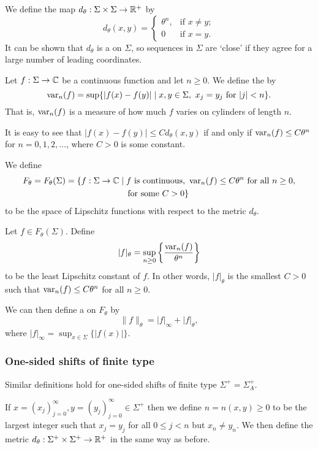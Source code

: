 We define the map $d_\theta : \Sigma \times \Sigma \to \mathbb{R}^+$ by
\[
	d_\theta(x, y) =
	\begin{cases}
		\theta^n, & \text{if } x \neq y; \\
		0 & \text{if } x = y.
	\end{cases}
\]
It can be shown that $d_\theta$ is a  on $\Sigma$, so sequences in $\Sigma$ are `close' if they agree for a large number of leading coordinates.

Let $f : \Sigma \to \mathbb{C}$ be a continuous function and let $n \geq 0$. We define the  by
\[
	\operatorname{var}_n(f) = \sup\{|f(x) - f(y)| \mid x, y \in \Sigma,\ x_j = y_j \text{ for } |j| < n\}.
\]
That is, $\operatorname{var}_n(f)$ is a measure of how much $f$ varies on cylinders of length $n$.~\cite[Lecture 8]{magic-ergodic}

It is easy to see that $|f(x) - f(y)| \leq Cd_\theta(x, y)$ if and only if $\operatorname{var}_n(f) \leq C\theta^n$ for $n = 0, 1, 2, \dots$, where $C > 0$ is some constant.

We define
\begin{align*}
	F_\theta = F_\theta(\Sigma) = \{f : \Sigma \to \mathbb{C} &\mid f \text{ is continuous}, \ \operatorname{var}_n(f) \leq C\theta^n \text{ for all } n \geq 0, \\
			& \quad \text{for some } C > 0\}
\end{align*}
to be the space of Lipschitz functions with respect to the metric $d_\theta$.

Let $f \in F_\theta(\Sigma)$. Define
\[
	|f|_\theta = \sup_{n \geq 0}\left\{\frac{\operatorname{var}_n(f)}{\theta^n}\right\}
\]
to be the least Lipschitz constant of $f$. In other words, $|f|_\theta$ is the smallest $C > 0$ such that $\operatorname{var}_n(f) \leq C\theta^n$ for all $n \geq 0$.

We can then define a  on $F_\theta$ by
\[
	\|f\|_\theta = |f|_\infty+ |f|_\theta,
\]
where $|f|_\infty = \sup_{x \in \Sigma}\{|f(x)|\}$.

\subsubsection{One-sided shifts of finite type}
Similar definitions hold for one-sided shifts of finite type $\Sigma^+ = \Sigma_A^+$.

If $x = (x_j)_{j = 0}^\infty, y = (y_j)_{j = 0}^\infty \in \Sigma^+$ then we define $n = n(x, y) \geq 0$ to be the largest integer such that $x_j = y_j$ for all $0 \leq j < n$ but $x_n \neq y_n$. We then define the metric $d_\theta : \Sigma^+ \times \Sigma^+ \to \mathbb{R}^+$ in the same way as before.

